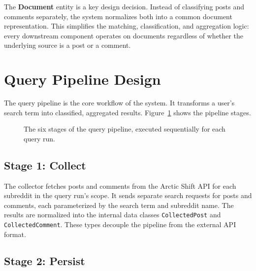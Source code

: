 The \textbf{Document} entity is a key design decision. Instead of classifying posts and comments separately, the system normalizes both into a common document representation. This simplifies the matching, classification, and aggregation logic: every downstream component operates on documents regardless of whether the underlying source is a post or a comment.

\section{Query Pipeline Design}
\label{sec:pipeline_design}

The query pipeline is the core workflow of the system. It transforms a user's search term into classified, aggregated results. Figure~\ref{fig:pipeline} shows the pipeline stages.

\begin{figure}[H]
    \centering
    \caption{The six stages of the query pipeline, executed sequentially for each query run.}
    \label{fig:pipeline}
\end{figure}

\subsection{Stage 1: Collect}

\begin{sloppypar}
The collector fetches posts and comments from the Arctic Shift API for each subreddit in the query run's scope. It sends separate search requests for posts and comments, each parameterized by the search term and subreddit name. The results are normalized into the internal data classes \texttt{CollectedPost} and \texttt{CollectedComment}. These types decouple the pipeline from the external API format.
\end{sloppypar}

\subsection{Stage 2: Persist}

